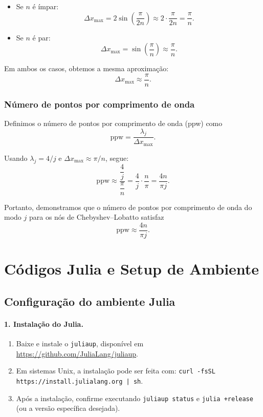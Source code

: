 \documentclass[12pt,a4paper]{article}
\begin{document}
\begin{itemize}
  \item Se $n$ é ímpar:
  \[
    \Delta x_{\max}
    = 2 \sin\!\left(\frac{\pi}{2n}\right)
    \approx 2 \cdot \frac{\pi}{2n}
    = \frac{\pi}{n}.
  \]

  \item Se $n$ é par:
  \[
    \Delta x_{\max}
    = \sin\!\left(\frac{\pi}{n}\right)
    \approx \frac{\pi}{n}.
  \]
\end{itemize}

Em ambos os casos, obtemos a mesma aproximação:
\[
  \Delta x_{\max} \approx \frac{\pi}{n}.
\]

\subsubsection{Número de pontos por comprimento de onda}

Definimos o número de pontos por comprimento de onda (ppw) como
\[
  \mathrm{ppw}
  = \frac{\lambda_j}{\Delta x_{\max}}.
\]

Usando $\lambda_j = 4/j$ e $\Delta x_{\max} \approx \pi/n$, segue:
\[
  \mathrm{ppw}
  \approx \frac{\dfrac{4}{j}}{\dfrac{\pi}{n}}
  = \frac{4}{j} \cdot \frac{n}{\pi}
  = \frac{4n}{\pi j}.
\]

\noindent
Portanto, demonstramos que o número de pontos por comprimento de onda
do modo $j$ para os nós de Chebyshev--Lobatto satisfaz
\[
  \boxed{\mathrm{ppw} \approx \dfrac{4n}{\pi j}}.
\]




\section{Códigos Julia e Setup de Ambiente}

\subsection{Configuração do ambiente Julia}

\paragraph{1. Instalação do Julia.}
\begin{enumerate}
    \item Baixe e instale o \texttt{juliaup}, disponível em
    \url{https://github.com/JuliaLang/juliaup}.
    \item Em sistemas Unix, a instalação pode ser feita com:
    \texttt{curl -fsSL https://install.julialang.org | sh}.
    \item Após a instalação, confirme executando \texttt{juliaup status}
    e \texttt{julia +release} (ou a versão específica desejada).
\end{enumerate}
\end{document}

